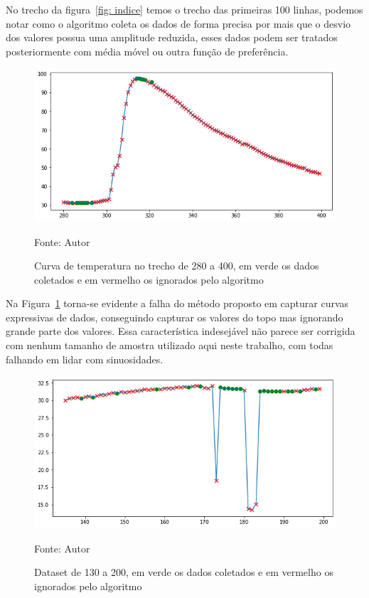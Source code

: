 No trecho da figura~\ref{fig: indice} temos o trecho das primeiras 100 linhas, podemos notar como o algoritmo coleta os dados de forma precisa por mais que o desvio dos valores possua uma amplitude reduzida, esses dados podem ser tratados posteriormente com média móvel ou outra função de preferência.


\begin{figure}[H]
	\centering
	\includegraphics[width=15cm]{imagens/sensores/indice2.png}
	\caption{Curva de temperatura no trecho de 280 a 400, em verde os dados coletados e em vermelho os ignorados pelo algoritmo}
	Fonte: Autor
	\label{fig: indice2}
\end{figure}

Na Figura~\ref{fig: indice2} torna-se evidente a falha do método proposto em capturar curvas expressivas de dados, conseguindo capturar os valores do topo mas ignorando grande parte dos valores. Essa característica indesejável não parece ser corrigida com nenhum tamanho de amostra utilizado aqui neste trabalho, com todas falhando em lidar com sinuosidades.

\begin{figure}[H]
	\centering
	\includegraphics[width=15cm]{imagens/sensores/indice4.png}
	\caption{Dataset de 130 a 200, em verde os dados coletados e em vermelho os ignorados pelo algoritmo}
	Fonte: Autor
	\label{fig: indice4}
\end{figure}

